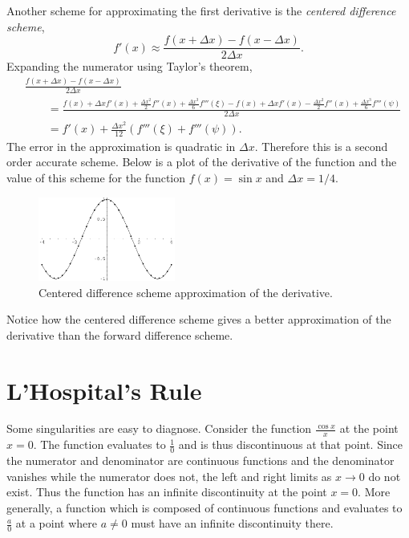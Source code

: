 \begin{Example}
  Another scheme for approximating the first derivative is the 
  \textit{centered difference scheme},
  \[
  f'(x) \approx \frac{f(x+\Delta x) - f(x-\Delta x)}{2 \Delta x}.
  \]
  Expanding the numerator using Taylor's theorem,
  \begin{align*}
    &\frac{f(x+\Delta x) - f(x-\Delta x)}{2 \Delta x} \\
    &\qquad= \frac{f(x) + \Delta x f'(x) + \frac{\Delta x^2}{2} f''(x)
      + \frac{\Delta x^3}{6} f'''(\xi)
      - f(x) + \Delta x f'(x) - \frac{\Delta x^2}{2} f''(x)
      + \frac{\Delta x^3}{6} f'''(\psi) }{2 \Delta x} \\
    &\qquad= f'(x) + \frac{\Delta x^2}{12}(f'''(\xi) + f'''(\psi)).
  \end{align*}
  The error in the approximation is quadratic in $\Delta x$.  Therefore
  this is a second order accurate scheme.
  Below is a plot of the derivative of the function and the 
  value of this scheme for the function $f(x) = \sin x$ and $\Delta x = 1/4$.

  \begin{figure}[h!]
    \begin{center}
      \includegraphics[width=0.4\textwidth]{calculus/differential/ctrsin}
    \end{center}
    \caption{Centered difference scheme approximation of the derivative.}
    \label{ctrsin}
  \end{figure}

  Notice how the centered difference scheme gives a better approximation of the 
  derivative than the forward difference scheme.
\end{Example}







\section{L'Hospital's Rule}

Some singularities are easy to diagnose.  Consider the function 
$\frac{\cos x}{x}$ at the point $x = 0$.  The function evaluates to 
$\frac{1}{0}$ and is thus discontinuous at that point.  Since the numerator
and denominator are continuous functions and the denominator vanishes while
the numerator does not, the left and right limits as $x \to 0$ do not 
exist.  Thus the function has an infinite discontinuity at the point
$x = 0$.  More generally, a function which is composed of continuous
functions and evaluates to $\frac{a}{0}$ at a point where $a \neq 0$ must
have an infinite discontinuity there.

